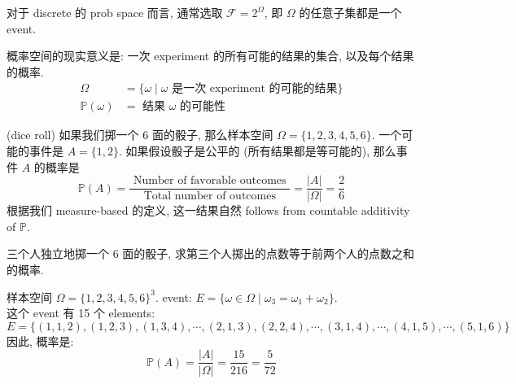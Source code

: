 \begin{remark}
    对于 discrete 的 prob space 而言, 通常选取 $\mathcal{F} = 2^{\Omega}$, 即 $\Omega$ 的任意子集都是一个 event.
\end{remark}
\begin{remark}
    概率空间的现实意义是: 一次 experiment 的所有可能的结果的集合, 以及每个结果的概率.
    \begin{align*}
        \Omega &= \{\omega \mid \omega \text{ 是一次 experiment 的可能的结果}\}\\
        \mathbb{P}(\omega) &= \text{ 结果 $\omega$ 的可能性}
    \end{align*}
\end{remark}

\begin{example}
    (dice roll) 
    如果我们掷一个 6 面的骰子, 那么样本空间 $\Omega=\{1,2,3,4,5,6\}$. 一个可能的事件是 $A=\{1,2\}$. 如果假设骰子是公平的 (所有结果都是等可能的), 那么事件 $A$ 的概率是
    \[
    \mathbb{P}(A)=\frac{\text { Number of favorable outcomes }}{\text { Total number of outcomes }}=\frac{|A|}{|\Omega|}=\frac{2}{6} 
    \]
    根据我们 measure-based 的定义, 这一结果自然 follows from countable additivity of $\mathbb{P}$.
\end{example}




\begin{example}
    三个人独立地掷一个 6 面的骰子, 求第三个人掷出的点数等于前两个人的点数之和的概率.
    \begin{solution}
        样本空间 $\Omega=\{1,2,3,4,5,6\}^3$.
        event: $E = \{ \omega \in \Omega \mid \omega_3 = \omega_1 + \omega_2 \}$.\\
        这个 event 有 15 个 elements: \[
        E = \{ (1,1,2), (1,2,3), (1,3,4), \cdots, (2,1,3), (2,2,4), \cdots, (3,1,4), \cdots, (4,1,5), \cdots, (5,1,6) \}
        \]
        因此, 概率是: \[
        \mathbb{P}(A)=\frac{|A|}{|\Omega|}=\frac{15}{216}=\frac{5}{72}
        \]
    \end{solution}
\end{example}



